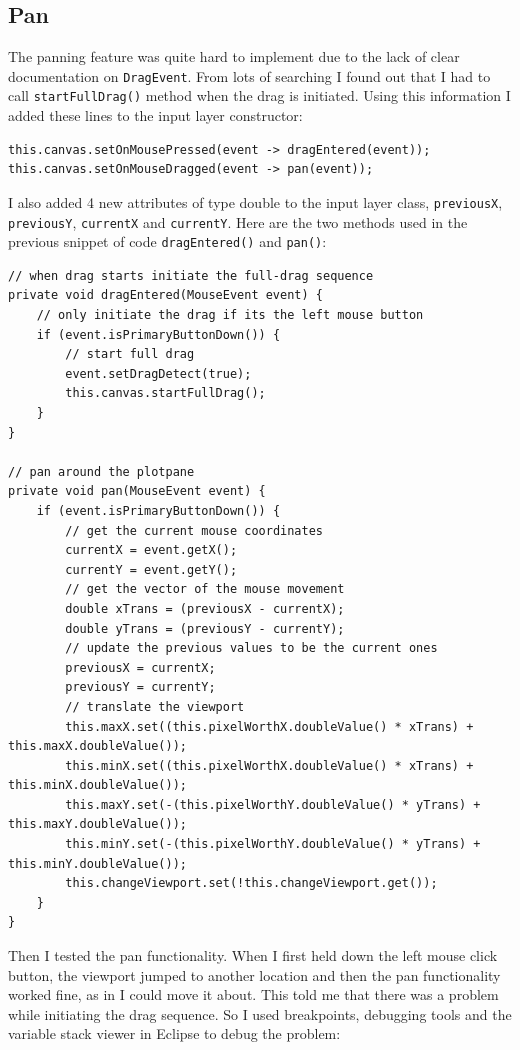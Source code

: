 \documentclass[../../../../main.tex]{subfiles}
\begin{document}
\subsection{Pan}
The panning feature was quite hard to implement due to the lack of clear documentation on \texttt{DragEvent}. From lots of searching I found out that I had to call \texttt{startFullDrag()} method when the drag is initiated. Using this information I added these lines to the input layer constructor:
\begin{verbatim}
this.canvas.setOnMousePressed(event -> dragEntered(event));
this.canvas.setOnMouseDragged(event -> pan(event));
\end{verbatim}
I also added 4 new attributes of type double to the input layer class, \texttt{previousX}, \texttt{previousY}, \texttt{currentX} and \texttt{currentY}. Here are the two methods used in the previous snippet of code \texttt{dragEntered()} and \texttt{pan()}:
\begin{verbatim}
// when drag starts initiate the full-drag sequence
private void dragEntered(MouseEvent event) {
	// only initiate the drag if its the left mouse button
	if (event.isPrimaryButtonDown()) {
		// start full drag
		event.setDragDetect(true);
		this.canvas.startFullDrag();
	}
}

// pan around the plotpane
private void pan(MouseEvent event) {
	if (event.isPrimaryButtonDown()) {
		// get the current mouse coordinates
		currentX = event.getX();
		currentY = event.getY();
		// get the vector of the mouse movement
		double xTrans = (previousX - currentX);
		double yTrans = (previousY - currentY);
		// update the previous values to be the current ones
		previousX = currentX;
		previousY = currentY;
		// translate the viewport
		this.maxX.set((this.pixelWorthX.doubleValue() * xTrans) + this.maxX.doubleValue());
		this.minX.set((this.pixelWorthX.doubleValue() * xTrans) + this.minX.doubleValue());
		this.maxY.set(-(this.pixelWorthY.doubleValue() * yTrans) + this.maxY.doubleValue());
		this.minY.set(-(this.pixelWorthY.doubleValue() * yTrans) + this.minY.doubleValue());
		this.changeViewport.set(!this.changeViewport.get());
	}
}
\end{verbatim}
\newpage
Then I tested the pan functionality. When I first held down the left mouse click button, the viewport jumped to another location and then the pan functionality worked fine, as in I could move it about. This told me that there was a problem while initiating the drag sequence. So I used breakpoints, debugging tools and the variable stack viewer in Eclipse to debug the problem:
\end{document}

